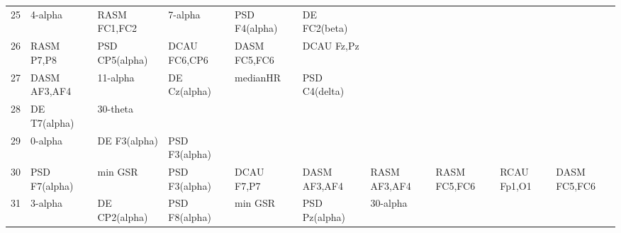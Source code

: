 \begin{landscape}
\begin{table}[]
\begin{tabular}{l|llllllll}
25       & 4-alpha               & RASM FC1,FC2          & 7-alpha              & PSD F4(alpha)           & DE FC2(beta)            &                      &                      &                       &                       &                    \\
26       & RASM P7,P8            & PSD CP5(alpha)        & DCAU FC6,CP6         & DASM FC5,FC6            & DCAU Fz,Pz              &                      &                      &                       &                       &                    \\
27       & DASM AF3,AF4          & 11-alpha              & DE Cz(alpha)         & medianHR                & PSD C4(delta)           &                      &                      &                       &                       &                    \\
28       & DE T7(alpha)          & 30-theta              &                      &                         &                         &                      &                      &                       &                       &                    \\
29       & 0-alpha               & DE F3(alpha)          & PSD F3(alpha)        &                         &                         &                      &                      &                       &                       &                    \\
30       & PSD F7(alpha)         & min GSR               & PSD F3(alpha)        & DCAU F7,P7              & DASM AF3,AF4            & RASM AF3,AF4         & RASM FC5,FC6         & RCAU Fp1,O1           & DASM FC5,FC6          &                    \\
31       & 3-alpha               & DE CP2(alpha)         & PSD F8(alpha)        & min GSR                 & PSD Pz(alpha)           & 30-alpha             &                      &                       &                       &                    \\
\end{tabular}
\end{table}
\end{landscape}
\clearpage
